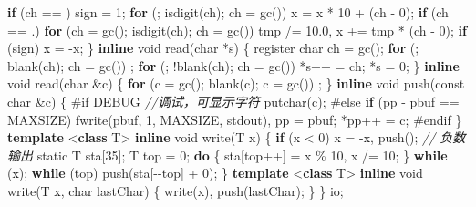 \documentclass[
]{article}
\newenvironment{Shaded}{}{}
\newcommand{\AttributeTok}[1]{\textcolor[rgb]{0.49,0.56,0.16}{#1}}
\newcommand{\CharTok}[1]{\textcolor[rgb]{0.25,0.44,0.63}{#1}}
\newcommand{\CommentTok}[1]{\textcolor[rgb]{0.38,0.63,0.69}{\textit{#1}}}
\newcommand{\ControlFlowTok}[1]{\textcolor[rgb]{0.00,0.44,0.13}{\textbf{#1}}}
\newcommand{\DataTypeTok}[1]{\textcolor[rgb]{0.56,0.13,0.00}{#1}}
\newcommand{\DecValTok}[1]{\textcolor[rgb]{0.25,0.63,0.44}{#1}}
\newcommand{\FloatTok}[1]{\textcolor[rgb]{0.25,0.63,0.44}{#1}}
\newcommand{\KeywordTok}[1]{\textcolor[rgb]{0.00,0.44,0.13}{\textbf{#1}}}
\newcommand{\NormalTok}[1]{#1}
\newcommand{\PreprocessorTok}[1]{\textcolor[rgb]{0.74,0.48,0.00}{#1}}
\begin{document}
\begin{Shaded}
\begin{Highlighting}[]
      \ControlFlowTok{if}\NormalTok{ (ch == }\CharTok{\textquotesingle{}{-}\textquotesingle{}}\NormalTok{) sign = }\DecValTok{1}\NormalTok{;}
    \ControlFlowTok{for}\NormalTok{ (; isdigit(ch); ch = gc()) x = x * }\DecValTok{10}\NormalTok{ + (ch {-} }\CharTok{\textquotesingle{}0\textquotesingle{}}\NormalTok{);}
    \ControlFlowTok{if}\NormalTok{ (ch == }\CharTok{\textquotesingle{}.\textquotesingle{}}\NormalTok{)}
      \ControlFlowTok{for}\NormalTok{ (ch = gc(); isdigit(ch); ch = gc())}
\NormalTok{        tmp /= }\FloatTok{10.0}\NormalTok{, x += tmp * (ch {-} }\CharTok{\textquotesingle{}0\textquotesingle{}}\NormalTok{);}
    \ControlFlowTok{if}\NormalTok{ (sign) x = {-}x;}
\NormalTok{  \}}
  \KeywordTok{inline} \DataTypeTok{void}\NormalTok{ read(}\DataTypeTok{char}\NormalTok{ *s) \{}
    \AttributeTok{register} \DataTypeTok{char}\NormalTok{ ch = gc();}
    \ControlFlowTok{for}\NormalTok{ (; blank(ch); ch = gc())}
\NormalTok{      ;}
    \ControlFlowTok{for}\NormalTok{ (; !blank(ch); ch = gc()) *s++ = ch;}
\NormalTok{    *s = }\DecValTok{0}\NormalTok{;}
\NormalTok{  \}}
  \KeywordTok{inline} \DataTypeTok{void}\NormalTok{ read(}\DataTypeTok{char}\NormalTok{ \&c) \{}
    \ControlFlowTok{for}\NormalTok{ (c = gc(); blank(c); c = gc())}
\NormalTok{      ;}
\NormalTok{  \}}
  \KeywordTok{inline} \DataTypeTok{void}\NormalTok{ push(}\AttributeTok{const} \DataTypeTok{char}\NormalTok{ \&c) \{}
\PreprocessorTok{\#if DEBUG  }\CommentTok{//调试，可显示字符}
\NormalTok{    putchar(c);}
\PreprocessorTok{\#else}
    \ControlFlowTok{if}\NormalTok{ (pp {-} pbuf == MAXSIZE) fwrite(pbuf, }\DecValTok{1}\NormalTok{, MAXSIZE, stdout), pp = pbuf;}
\NormalTok{    *pp++ = c;}
\PreprocessorTok{\#endif}
\NormalTok{  \}}
  \KeywordTok{template}\NormalTok{ \textless{}}\KeywordTok{class}\NormalTok{ T\textgreater{}}
  \KeywordTok{inline} \DataTypeTok{void}\NormalTok{ write(T x) \{}
    \ControlFlowTok{if}\NormalTok{ (x \textless{} }\DecValTok{0}\NormalTok{) x = {-}x, push(}\CharTok{\textquotesingle{}{-}\textquotesingle{}}\NormalTok{);  }\CommentTok{// 负数输出}
    \AttributeTok{static}\NormalTok{ T sta[}\DecValTok{35}\NormalTok{];}
\NormalTok{    T top = }\DecValTok{0}\NormalTok{;}
    \ControlFlowTok{do}\NormalTok{ \{}
\NormalTok{      sta[top++] = x \% }\DecValTok{10}\NormalTok{, x /= }\DecValTok{10}\NormalTok{;}
\NormalTok{    \} }\ControlFlowTok{while}\NormalTok{ (x);}
    \ControlFlowTok{while}\NormalTok{ (top) push(sta[{-}{-}top] + }\CharTok{\textquotesingle{}0\textquotesingle{}}\NormalTok{);}
\NormalTok{  \}}
  \KeywordTok{template}\NormalTok{ \textless{}}\KeywordTok{class}\NormalTok{ T\textgreater{}}
  \KeywordTok{inline} \DataTypeTok{void}\NormalTok{ write(T x, }\DataTypeTok{char}\NormalTok{ lastChar) \{}
\NormalTok{    write(x), push(lastChar);}
\NormalTok{  \}}
\NormalTok{\} io;}
\end{Highlighting}
\end{Shaded}
\end{document}
